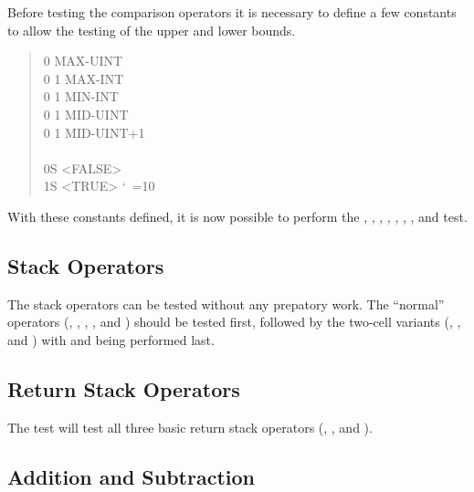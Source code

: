 Before testing the comparison operators it is necessary to define
a few constants to allow the testing of the upper and lower bounds.

\begin{quote}\ttfamily\frenchspacing\obeyspaces\setlength{\leftmargin}{-10pt}
0                 					 MAX-UINT \\
0  1        			 MAX-INT \\
0  1  	 MIN-INT \\
0  1        			 MID-UINT \\
0  1  	 MID-UINT+1 \\
\\
0S  <FALSE> \\
1S  <TRUE>
\nonfrenchspacing\catcode`\ =10
\end{quote}


With these constants defined, it is now possible to perform the
	,
	,
	,
	,
	,
	,
	, and
	 test.

\subsection{Stack Operators}

The stack operators can be tested without any prepatory work.  The
``normal'' operators
	(,
	 ,
	 ,
	 , and
	 )
should be tested first, followed by the two-cell variants
	(,
	 ,
	  and \linebreak
	 )
with  and  being
performed last.

\subsection{Return Stack Operators}

The test  will test all three basic return
stack operators (, , and ).

\subsection{Addition and Subtraction}

